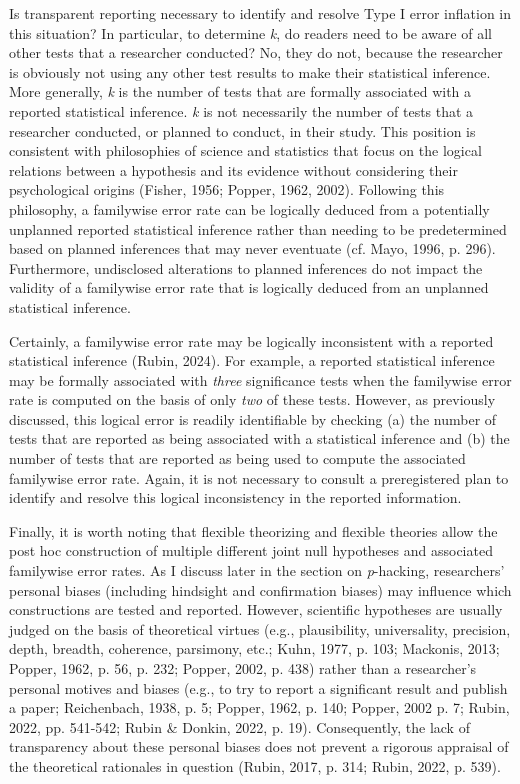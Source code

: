 \documentclass[authordate, empirical]{jote-new-article}
\begin{document}
	Is transparent reporting necessary to identify and resolve Type I error inflation in this situation? In particular, to determine \emph{k}, do readers need to be aware of all other tests that a researcher conducted? No, they do not, because the researcher is obviously not using any other test results to make their statistical inference. More generally, \emph{k} is the number of tests that are formally associated with a reported statistical inference. \emph{k} is not necessarily the number of tests that a researcher conducted, or planned to conduct, in their study. This position is consistent with philosophies of science and statistics that focus on the logical relations between a hypothesis and its evidence without considering their psychological origins (Fisher, 1956; Popper, 1962, 2002). Following this philosophy, a familywise error rate can be logically deduced from a potentially unplanned reported statistical inference rather than needing to be predetermined based on planned inferences that may never eventuate (cf. Mayo, 1996, p. 296). Furthermore, undisclosed alterations to planned inferences do not impact the validity of a familywise error rate that is logically deduced from an unplanned statistical inference.



	Certainly, a familywise error rate may be logically inconsistent with a reported statistical inference (Rubin, 2024). For example, a reported statistical inference may be formally associated with \emph{three} significance tests when the familywise error rate is computed on the basis of only \emph{two} of these tests. However, as previously discussed, this logical error is readily identifiable by checking (a) the number of tests that are reported as being associated with a statistical inference and (b) the number of tests that are reported as being used to compute the associated familywise error rate. Again, it is not necessary to consult a preregistered plan to identify and resolve this logical inconsistency in the reported information.



	Finally, it is worth noting that flexible theorizing and flexible theories allow the post hoc construction of multiple different joint null hypotheses and associated familywise error rates. As I discuss later in the section on \emph{p}-hacking, researchers' personal biases (including hindsight and confirmation biases) may influence which constructions are tested and reported. However, scientific hypotheses are usually judged on the basis of theoretical virtues (e.g., plausibility, universality, precision, depth, breadth, coherence, parsimony, etc.; Kuhn, 1977, p. 103; Mackonis, 2013; Popper, 1962, p. 56, p. 232; Popper, 2002, p. 438) rather than a researcher's personal motives and biases (e.g., to try to report a significant result and publish a paper; Reichenbach, 1938, p. 5; Popper, 1962, p. 140; Popper, 2002 p. 7; Rubin, 2022, pp. 541-542; Rubin \& Donkin, 2022, p. 19). Consequently, the lack of transparency about these personal biases does not prevent a rigorous appraisal of the theoretical rationales in question (Rubin, 2017, p. 314; Rubin, 2022, p. 539).
\end{document}
